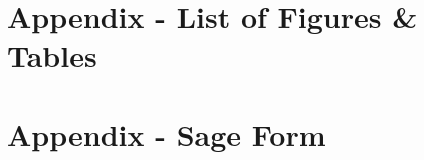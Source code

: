 \printbibliography

\appendix

\section{Appendix - List of Figures \& Tables}
\listoffigures
\listoftables
\newpage

\section{Appendix - Sage Form}


